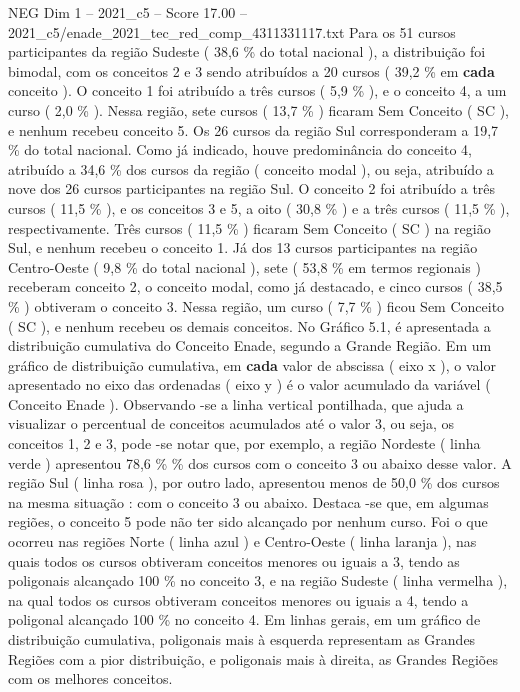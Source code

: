 \begin{textsample}{NEG Dim 1 – 2021\_c5 – Score 17.00 – 2021\_c5/enade\_2021\_tec\_red\_comp\_4311331117.txt}
Para os 51 cursos participantes da região Sudeste ( 38,6 \% do total nacional ), a distribuição foi bimodal, com os conceitos 2 e 3 sendo atribuídos a 20 cursos ( 39,2 \% em \textbf{cada} conceito ).
O conceito 1 foi atribuído a três cursos ( 5,9 \% ), e o conceito 4, a um curso ( 2,0 \% ).
Nessa região, sete cursos ( 13,7 \% ) ficaram Sem Conceito ( SC ), e nenhum recebeu conceito 5.
Os 26 cursos da região Sul corresponderam a 19,7 \% do total nacional.
Como já indicado, houve predominância do conceito 4, atribuído a 34,6 \% dos cursos da região ( conceito modal ), ou seja, atribuído a nove dos 26 cursos participantes na região Sul.
O conceito 2 foi atribuído a três cursos ( 11,5 \% ), e os conceitos 3 e 5, a oito ( 30,8 \% ) e a três cursos ( 11,5 \% ), respectivamente.
Três cursos ( 11,5 \% ) ficaram Sem Conceito ( SC ) na região Sul, e nenhum recebeu o conceito 1.
Já dos 13 cursos participantes na região Centro-Oeste ( 9,8 \% do total nacional ), sete ( 53,8 \% em termos regionais ) receberam conceito 2, o conceito modal, como já destacado, e cinco cursos ( 38,5 \% ) obtiveram o conceito 3.
Nessa região, um curso ( 7,7 \% ) ficou Sem Conceito ( SC ), e nenhum recebeu os demais conceitos.
No Gráfico 5.1, é apresentada a distribuição cumulativa do Conceito Enade, segundo a Grande Região.
Em um gráfico de distribuição cumulativa, em \textbf{cada} valor de abscissa ( eixo x ), o valor apresentado no eixo das ordenadas ( eixo y ) é o valor acumulado da variável ( Conceito Enade ).
Observando -se a linha vertical pontilhada, que ajuda a visualizar o percentual de conceitos acumulados até o valor 3, ou seja, os conceitos 1, 2 e 3, pode -se notar que, por exemplo, a região Nordeste ( linha verde ) apresentou 78,6 \% \% dos cursos com o conceito 3 ou abaixo desse valor.
A região Sul ( linha rosa ), por outro lado, apresentou menos de 50,0 \% dos cursos na mesma situação : com o conceito 3 ou abaixo.
Destaca -se que, em algumas regiões, o conceito 5 pode não ter sido alcançado por nenhum curso.
Foi o que ocorreu nas regiões Norte ( linha azul ) e Centro-Oeste ( linha laranja ), nas quais todos os cursos obtiveram conceitos menores ou iguais a 3, tendo as poligonais alcançado 100 \% no conceito 3, e na região Sudeste ( linha vermelha ), na qual todos os cursos obtiveram conceitos menores ou iguais a 4, tendo a poligonal alcançado 100 \% no conceito 4.
Em linhas gerais, em um gráfico de distribuição cumulativa, poligonais mais à esquerda representam as Grandes Regiões com a pior distribuição, e poligonais mais à direita, as Grandes Regiões com os melhores conceitos.

\end{textsample}
